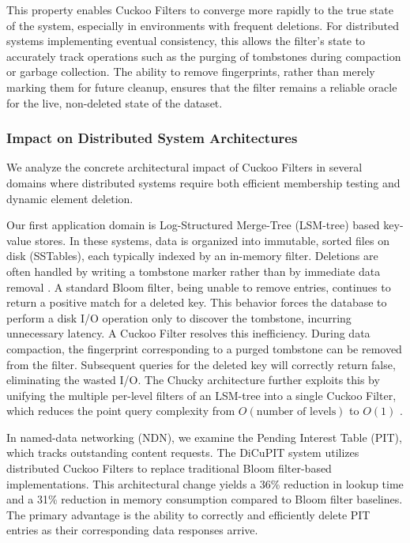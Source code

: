 This property enables Cuckoo Filters to converge more rapidly to the true state of the system, especially in environments with frequent deletions. For distributed systems implementing eventual consistency, this allows the filter's state to accurately track operations such as the purging of tombstones during compaction or garbage collection. The ability to remove fingerprints, rather than merely marking them for future cleanup, ensures that the filter remains a reliable oracle for the live, non-deleted state of the dataset.

\subsubsection{Impact on Distributed System Architectures} \label{subsubsec:arch-impact}

We analyze the concrete architectural impact of Cuckoo Filters in several domains where distributed systems require both efficient membership testing and dynamic element deletion.

Our first application domain is Log-Structured Merge-Tree (LSM-tree) based key-value stores. In these systems, data is organized into immutable, sorted files on disk (SSTables), each typically indexed by an in-memory filter. Deletions are often handled by writing a tombstone marker rather than by immediate data removal \cite{Mosharraf2021ImprovingLA}. A standard Bloom filter, being unable to remove entries, continues to return a positive match for a deleted key. This behavior forces the database to perform a disk I/O operation only to discover the tombstone, incurring unnecessary latency. A Cuckoo Filter resolves this inefficiency. During data compaction, the fingerprint corresponding to a purged tombstone can be removed from the filter. Subsequent queries for the deleted key will correctly return false, eliminating the wasted I/O. The Chucky architecture further exploits this by unifying the multiple per-level filters of an LSM-tree into a single Cuckoo Filter, which reduces the point query complexity from $O(\text{number of levels})$ to $O(1)$ \cite{Dayan2021ChuckyAS}.

In named-data networking (NDN), we examine the Pending Interest Table (PIT), which tracks outstanding content requests. The DiCuPIT system \cite{Mahmoudi2023DiCuPITDC} utilizes distributed Cuckoo Filters to replace traditional Bloom filter-based implementations. This architectural change yields a 36\% reduction in lookup time and a 31\% reduction in memory consumption compared to Bloom filter baselines. The primary advantage is the ability to correctly and efficiently delete PIT entries as their corresponding data responses arrive.

